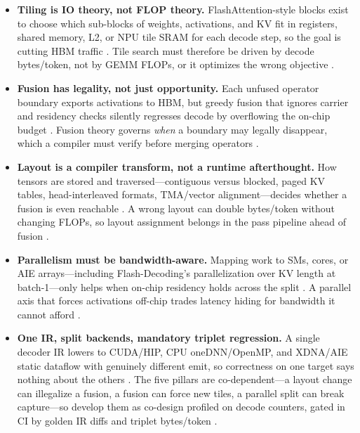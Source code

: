 \begin{itemize}
\item \textbf{Tiling is IO theory, not FLOP theory.}
FlashAttention-style blocks exist to choose which sub-blocks of weights, activations, and KV fit in registers, shared memory, L2, or NPU tile SRAM for each decode step, so the goal is cutting HBM traffic \citep{dao2022flashattention,semianalysis2024tma}. Tile search must therefore be driven by decode bytes/token, not by GEMM FLOPs, or it optimizes the wrong objective \citep{memoryfloor2026,taxbreak2026}.

\item \textbf{Fusion has legality, not just opportunity.}
Each unfused operator boundary exports activations to HBM, but greedy fusion that ignores carrier and residency checks silently regresses decode by overflowing the on-chip budget \citep{dao2022flashattention,yirage2026}. Fusion theory governs \emph{when} a boundary may legally disappear, which a compiler must verify before merging operators \citep{chen2020compilerbasedhardw,patel2025llminference}.

\item \textbf{Layout is a compiler transform, not a runtime afterthought.}
How tensors are stored and traversed---contiguous versus blocked, paged KV tables, head-interleaved formats, TMA/vector alignment---decides whether a fusion is even reachable \citep{kwon2023vllm,patel2025llminference}. A wrong layout can double bytes/token without changing FLOPs, so layout assignment belongs in the pass pipeline ahead of fusion \citep{taxbreak2026,yirage2026}.

\item \textbf{Parallelism must be bandwidth-aware.}
Mapping work to SMs, cores, or AIE arrays---including Flash-Decoding's parallelization over KV length at batch-1---only helps when on-chip residency holds across the split \citep{dao2023flashdecoding,semianalysis2024tma}. A parallel axis that forces activations off-chip trades latency hiding for bandwidth it cannot afford \citep{memoryfloor2026,patel2025llminference}.

\item \textbf{One IR, split backends, mandatory triplet regression.}
A single decoder IR lowers to CUDA/HIP, CPU oneDNN/OpenMP, and XDNA/AIE static dataflow with genuinely different emit, so correctness on one target says nothing about the others \citep{yirage2026,amd2024xdna,amd2024aie}. The five pillars are co-dependent---a layout change can illegalize a fusion, a fusion can force new tiles, a parallel split can break capture---so develop them as co-design profiled on decode counters, gated in CI by golden IR diffs and triplet bytes/token \citep{chen2020compilerbasedhardw,memoryfloor2026,taxbreak2026}.
\end{itemize}

